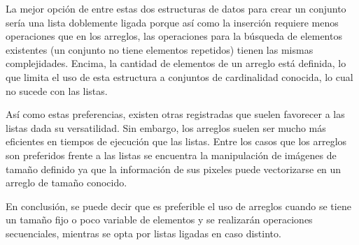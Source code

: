 \documentclass[paper=leter, fontsize=11pt]{scrartcl}
\numberwithin{equation}{section}		%
\numberwithin{figure}{section}			%
\numberwithin{table}{section}				%
\begin{document}
La mejor opción de entre estas dos estructuras de datos para crear un conjunto sería una lista doblemente ligada porque así como la inserción requiere menos operaciones que en los arreglos, las operaciones para la búsqueda de elementos existentes (un conjunto no tiene elementos repetidos) tienen las mismas complejidades. Encima, la cantidad de elementos de un arreglo está definida, lo que limita el uso de esta estructura a conjuntos de cardinalidad conocida, lo cual no sucede con las listas.

Así como estas preferencias, existen otras registradas que suelen favorecer a las listas dada su versatilidad. Sin embargo, los arreglos suelen ser mucho más eficientes en tiempos de ejecución que las listas\nocite{arrayVSlist}. Entre los casos que los arreglos son preferidos frente a las listas se encuentra la manipulación de imágenes de tamaño definido ya que la información de sus pixeles puede vectorizarse en un arreglo de tamaño conocido.

En conclusión, se puede decir que es preferible el uso de arreglos cuando se tiene un tamaño fijo o poco variable de elementos y se realizarán operaciones secuenciales, mientras se opta por listas ligadas en caso distinto.



\end{document}
